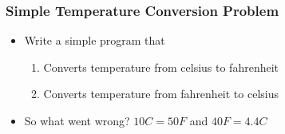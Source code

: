 \documentclass[10pt,t]{beamer}
\begin{document}
\begin{frame}[fragile]
  \frametitle{Simple Temperature Conversion Problem}
  \begin{itemize}
    \item Write a simple program that 
    \begin{enumerate}
      \item Converts temperature from celsius to fahrenheit
      \item Converts temperature from fahrenheit to celsius
    \end{enumerate}
      \begin{columns}[t]
        Fortran},basicstyle=\fontsize{6}{5}\selectfont\ttfamily]{./Exercise/simple.f90}
        \column{0.6\textwidth}
        \begin{lstlisting}[basicstyle=\fontsize{6}{5}\selectfont\ttfamily]
altair:Exercise apacheco$ gfortran simple.f90
altair:Exercise apacheco$ ./a.out 
 10C =    42.0000000     F
 40F =    0.00000000     C
        \end{lstlisting}
      \end{columns}
    \item So what went wrong? $10C = 50F$ and $40F = 4.4C$
  \end{itemize}
\end{frame}
\end{document}
